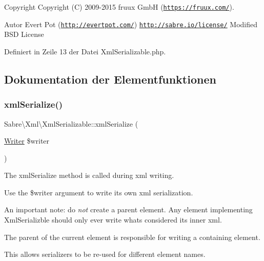 \begin{DoxyCopyright}{Copyright}
Copyright (C) 2009-\/2015 fruux GmbH (\href{https://fruux.com/}{\tt https\+://fruux.\+com/}). 
\end{DoxyCopyright}
\begin{DoxyAuthor}{Autor}
Evert Pot (\href{http://evertpot.com/}{\tt http\+://evertpot.\+com/})  \href{http://sabre.io/license/}{\tt http\+://sabre.\+io/license/} Modified B\+SD License 
\end{DoxyAuthor}


Definiert in Zeile 13 der Datei Xml\+Serializable.\+php.



\subsection{Dokumentation der Elementfunktionen}
\mbox{\label{interface_sabre_1_1_xml_1_1_xml_serializable_aa78f3ee43aa699be8347181653a53d8c}} 
\subsubsection{\texorpdfstring{xml\+Serialize()}{xmlSerialize()}}
{\footnotesize\ttfamily Sabre\textbackslash{}\+Xml\textbackslash{}\+Xml\+Serializable\+::xml\+Serialize (\begin{DoxyParamCaption}\item[{\mbox{\hyperlink{class_sabre_1_1_xml_1_1_writer}{Writer}}}]{\$writer }\end{DoxyParamCaption})}

The xml\+Serialize method is called during xml writing.

Use the \$writer argument to write its own xml serialization.

An important note\+: do {\itshape not} create a parent element. Any element implementing Xml\+Serializble should only ever write what\textquotesingle{}s considered its \textquotesingle{}inner xml\textquotesingle{}.

The parent of the current element is responsible for writing a containing element.

This allows serializers to be re-\/used for different element names.

